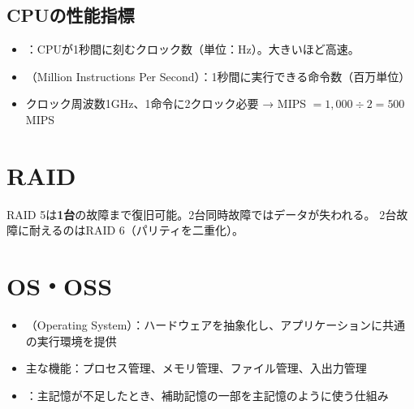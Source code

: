 \subsection{CPUの性能指標}

\begin{teigi}[クロック周波数とCPI]
\begin{itemize}
  \item {}：CPUが1秒間に刻むクロック数（単位：Hz）。大きいほど高速。
  \item {}（Million Instructions Per Second）：1秒間に実行できる命令数（百万単位）
  \item クロック周波数1GHz、1命令に2クロック必要 → MIPS $= 1{,}000 \div 2 = 500$ MIPS
\end{itemize}
\end{teigi}

\section{RAID}

\begin{hikaku}
\end{hikaku}

\begin{pitfall}
RAID 5は\textbf{1台}の故障まで復旧可能。2台同時故障ではデータが失われる。
2台故障に耐えるのはRAID 6（パリティを二重化）。
\end{pitfall}

\section{OS・OSS}

\begin{teigi}[OSの役割]
\begin{itemize}
  \item {}（Operating System）：ハードウェアを抽象化し、アプリケーションに共通の実行環境を提供
  \item 主な機能：プロセス管理、メモリ管理、ファイル管理、入出力管理
  \item {}：主記憶が不足したとき、補助記憶の一部を主記憶のように使う仕組み
\end{itemize}
\end{teigi}


